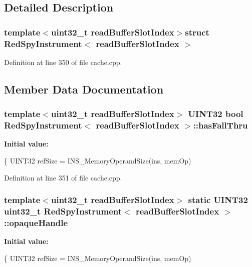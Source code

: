 \subsection{Detailed Description}
\subsubsection*{template$<$uint32\-\_\-t read\-Buffer\-Slot\-Index$>$struct Red\-Spy\-Instrument$<$ read\-Buffer\-Slot\-Index $>$}



Definition at line 350 of file cache.\-cpp.



\subsection{Member Data Documentation}
\hypertarget{structRedSpyInstrument_ae00cf06f2edc2cd55f9357b9b750ad80}{
\subsubsection[{has\-Fall\-Thru}]{\setlength{\rightskip}{0pt plus 5cm}template$<$uint32\-\_\-t read\-Buffer\-Slot\-Index$>$ U\-I\-N\-T32 bool {\bf Red\-Spy\-Instrument}$<$ read\-Buffer\-Slot\-Index $>$\-::has\-Fall\-Thru}}\label{structRedSpyInstrument_ae00cf06f2edc2cd55f9357b9b750ad80}
{\bfseries Initial value\-:}
\begin{DoxyCode}
\{
        UINT32 refSize = INS\_MemoryOperandSize(ins, memOp)
\end{DoxyCode}


Definition at line 351 of file cache.\-cpp.

\hypertarget{structRedSpyInstrument_a609bdbc109aafe3dcf9b9916d7456393}{
\subsubsection[{opaque\-Handle}]{\setlength{\rightskip}{0pt plus 5cm}template$<$uint32\-\_\-t read\-Buffer\-Slot\-Index$>$ static U\-I\-N\-T32 uint32\-\_\-t {\bf Red\-Spy\-Instrument}$<$ read\-Buffer\-Slot\-Index $>$\-::opaque\-Handle}}\label{structRedSpyInstrument_a609bdbc109aafe3dcf9b9916d7456393}
{\bfseries Initial value\-:}
\begin{DoxyCode}
\{
        UINT32 refSize = INS\_MemoryOperandSize(ins, memOp)
\end{DoxyCode}


